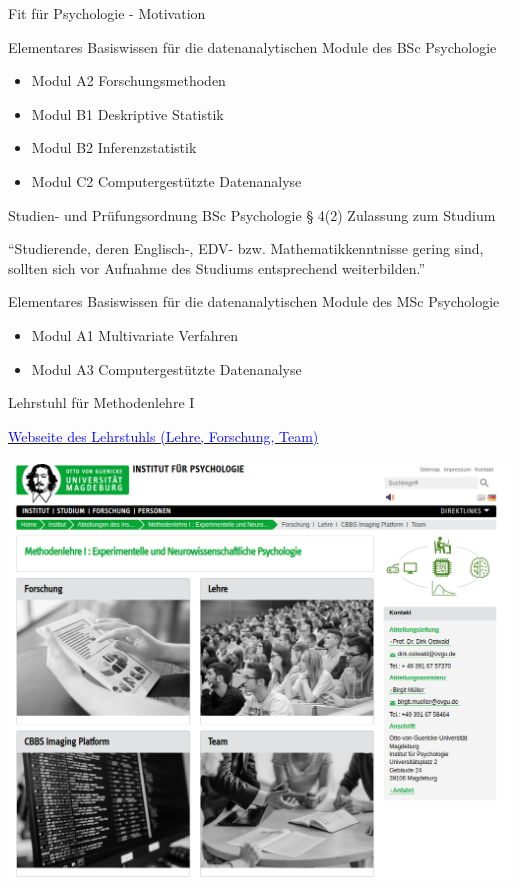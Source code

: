 \documentclass[
  8pt,
  ignorenonframetext,
  t]{beamer}
\providecommand{\tightlist}{%
  \setlength{\itemsep}{0pt}\setlength{\parskip}{0pt}}
\begin{document}
\begin{frame}{Fit für Psychologie - Motivation}
\protect\hypertarget{fit-fuxfcr-psychologie---motivation}{}

Elementares Basiswissen für die datenanalytischen Module des BSc
Psychologie

\small

\begin{itemize}
\tightlist
\item
  Modul A2 Forschungsmethoden
\item
  Modul B1 Deskriptive Statistik
\item
  Modul B2 Inferenzstatistik
\item
  Modul C2 Computergestützte Datenanalyse
\end{itemize}

\normalsize

Studien- und Prüfungsordnung BSc Psychologie § 4(2) Zulassung zum
Studium

\small

``Studierende, deren Englisch-, EDV- bzw. Mathematikkenntnisse gering
sind, sollten sich vor Aufnahme des Studiums entsprechend
weiterbilden.''

\normalsize

Elementares Basiswissen für die datenanalytischen Module des MSc
Psychologie

\small

\begin{itemize}
\tightlist
\item
  Modul A1 Multivariate Verfahren
\item
  Modul A3 Computergestützte Datenanalyse
\end{itemize}
\end{frame}

\begin{frame}{Lehrstuhl für Methodenlehre I}
\protect\hypertarget{lehrstuhl-fuxfcr-methodenlehre-i}{}

\href{https://www.ipsy.ovgu.de/methodenlehre_I-path-980,1404.html}{\textcolor{blue}{Webseite des Lehrstuhls (Lehre, Forschung, Team)}}

\vspace{3mm}

\begin{center}\includegraphics[width=0.7\linewidth]{../Abbildungen/Lehrstuhlseite} \end{center}
\end{frame}
\end{document}
